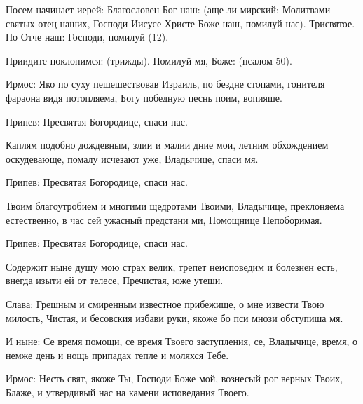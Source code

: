 \begin{mymulticols}
 




Посем начинает иерей: Благословен Бог наш: (аще ли мирский: Молитвами святых отец наших, Господи Иисусе Христе Боже наш, помилуй нас). Трисвятое. По Отче наш: Господи, помилуй (12).


Приидите поклонимся: (трижды). Помилуй мя, Боже: (псалом 50).




Ирмос: Яко по суху пешешествовав Израиль, по бездне стопами, гонителя фараона видя потопляема, Богу победную песнь поим, вопияше.





Припев: Пресвятая Богородице, спаси нас.


Каплям подобно дождевным, злии и малии дние мои, летним обхождением оскудевающе, помалу исчезают уже, Владычице, спаси мя.


Припев: Пресвятая Богородице, спаси нас.


Твоим благоутробием и многими щедротами Твоими, Владычице, преклоняема естественно, в час сей ужасный предстани ми, Помощнице Непоборимая.


Припев: Пресвятая Богородице, спаси нас.


Содержит ныне душу мою страх велик, трепет неисповедим и болезнен есть, внегда изыти ей от телесе, Пречистая, юже утеши.


Слава: Грешным и смиренным известное прибежище, о мне извести Твою милость, Чистая, и бесовския избави руки, якоже бо пси мнози обступиша мя.


И ныне: Се время помощи, се время Твоего заступления, се, Владычице, время, о немже день и нощь припадах тепле и моляхся Тебе.




Ирмос: Несть свят, якоже Ты, Господи Боже мой, вознесый рог верных Твоих, Блаже, и утвердивый нас на камени исповедания Твоего.






\end{mymulticols}
